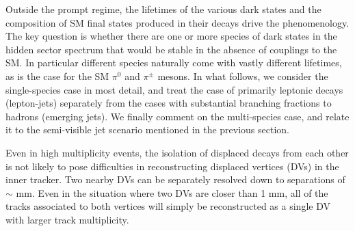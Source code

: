 \begin{enumerate}
Outside the prompt regime, the lifetimes of the various dark states and the composition of SM final states produced in their decays drive the phenomenology. The key question is whether there are one or more species of dark states in the hidden sector spectrum that would be stable in the absence of couplings to the SM. In particular different species naturally come with vastly different lifetimes, as is the case for the SM $\pi^0$ and $\pi^\pm$ mesons. In what follows, we consider the single-species case in most detail, and treat the case of primarily leptonic decays (lepton-jets)  separately from the cases with substantial branching fractions to hadrons (emerging jets). We finally comment on the multi-species case, and relate it to the semi-visible jet scenario mentioned in the previous section.

Even in high multiplicity events, the isolation of displaced decays from each other is not likely to pose difficulties in reconstructing displaced vertices (DVs) in the inner tracker.  Two nearby DVs can be separately resolved down to separations of $\sim$ mm.  Even in the situation where two DVs are closer than 1 mm, all of the tracks associated to both vertices will simply be reconstructed as a single DV with larger track multiplicity.


\end{enumerate}
